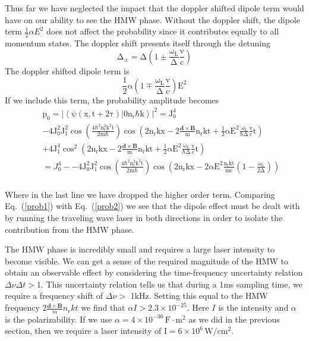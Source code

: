 Thus far we have neglected the impact that the doppler shifted dipole term would have on our ability to see the HMW phase.  Without the doppler shift, the dipole term $\frac{1}{2}\alpha E^2$ does not affect the probability since it contributes equally to all momentum states.  The doppler shift presents itself through the detuning 
\begin{equation}
\mathrm{\Delta_{\pm}=\Delta\left(1\pm \frac{\omega_{L}}{\Delta}\frac{v}{c}\right)}
\end{equation}
The doppler shifted dipole term is
\begin{equation}
\mathrm{\frac{1}{2}\alpha\left(1\mp \frac{\omega_{L}}{\Delta}\frac{v}{c}\right)E^2}
\end{equation}
If we include this term, the probability amplitude becomes
\begin{eqnarray}
&&\mathrm{p_0=|\left<\psi(x,t+2\tau)|0n_r\hbar k\right>|^2=J_0^4}\nonumber \\
&&\mathrm{-4J_0^2J_1^2\cos{\left(\frac{4\hbar^2n_r^2k^2t}{2m\hbar}\right)}\cos{\left(2n_rkx-2\frac{\mathbf{d}\times\mathbf{B}}{m}n_rkt+\frac{1}{2}\alpha E^2\frac{\omega_L}{\hbar \Delta}\frac{v}{c}t\right)}} \nonumber \\
&&\mathrm{+4J_1^4\cos^2{\left(2n_rkx-2\frac{\mathbf{d}\times\mathbf{B}}{m}n_rkt+\frac{1}{2}\alpha E^2\frac{\omega_L}{\hbar \Delta}\frac{v}{c}t\right)}} \nonumber \\
&&=J_0^4-\mathrm{-4J_0^2J_1^2\cos{\left(\frac{4\hbar^2n_r^2k^2t}{2m\hbar}\right)}\cos{\left(2n_rkx-2\alpha E^2\frac{n_rkt}{mc}\left(1-\frac{\omega_L}{2\Delta}\right)\right)}} \nonumber \\
\label{prob2}
\end{eqnarray}

Where in the last line we have dropped the higher order term. Comparing  Eq.\ (\ref{prob1}) with  Eq.\ (\ref{prob2}) we see that the dipole effect must be dealt with by running the traveling wave laser in both directions in order to isolate the contribution from the HMW phase.
\vspace{5mm}
 
The HMW phase is incredibly small and requires a large laser intensity to become visible.  We can get a sense of the required magnitude of the HMW to obtain an observable effect by considering the time-frequency uncertainty relation $\Delta \nu \Delta t>1$.  This uncertainty relation tells us that during a 1ms sampling time, we require a frequency shift of $\Delta \nu>$ 1kHz. Setting this equal to the HMW frequency $2\frac{\mathbf{d}\times\mathbf{B}}{m}n_rkt$ we find that $\alpha I>2.3\times 10^{-25}$. Here $I$ is the intensity and $\alpha$ is the polarizability. If we use $\alpha=4\times10^{-36}\,\mathrm{F\cdot m^2}$ as we did in the previous section, then we require a laser intensity of $\mathrm{I=6 \times 10^{6}\,W/cm^2}$. 

